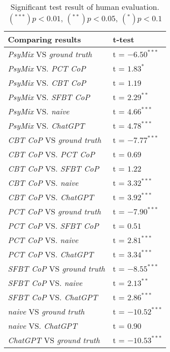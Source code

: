 \begin{table}[th]
    \centering
    \begin{tabular}{ll}
    \toprule
      Comparing results   & t-test \\   
    \midrule
    \textit{PsyMix} VS \textit{ground truth}    & t = $-6.50^{***}$     \\
    \textit{PsyMix} VS. \textit{PCT CoP}    & t = $1.83^{*}$  \\
    \textit{PsyMix} VS. \textit{CBT CoP}    & t = $1.19$  \\
    \textit{PsyMix} VS. \textit{SFBT CoP}    & t = $2.29^{**}$  \\
    \textit{PsyMix} VS. \textit{naive}    & t = $4.66^{***}$  \\
    \textit{PsyMix} VS. \textit{ChatGPT}    & t = $4.78^{***}$  \\
    \midrule
    \textit{CBT CoP} VS \textit{ground truth}    & t = $-7.77^{***}$     \\
    \textit{CBT CoP} VS. \textit{PCT CoP}    & t = $0.69$  \\
    \textit{CBT CoP} VS. \textit{SFBT CoP}    & t = $1.22$  \\
    \textit{CBT CoP} VS. \textit{naive}    & t = $3.32^{***}$  \\
    \textit{CBT CoP} VS. \textit{ChatGPT}    & t = $3.92^{***}$  \\
    \midrule
    \textit{PCT CoP} VS \textit{ground truth}    & t = $-7.90^{***}$     \\
    \textit{PCT CoP} VS. \textit{SFBT CoP}    & t = $0.51$  \\
    \textit{PCT CoP} VS. \textit{naive}    & t = $2.81^{***}$  \\
    \textit{PCT CoP} VS. \textit{ChatGPT}    & t = $3.34^{***}$  \\
    \midrule
    \textit{SFBT CoP} VS \textit{ground truth}    & t = $-8.55^{***}$     \\
    \textit{SFBT CoP} VS. \textit{naive}    & t = $2.13^{**}$  \\
    \textit{SFBT CoP} VS. \textit{ChatGPT}    & t = $2.86^{***}$  \\
    \midrule
    \textit{naive} VS \textit{ground truth}    & t = $-10.52^{***}$     \\
    \textit{naive} VS. \textit{ChatGPT}    & t = $0.90$  \\
    \midrule
    \textit{ChatGPT} VS \textit{ground truth}    & t = $-10.53^{***}$     \\
    \bottomrule
    \end{tabular}
    \caption{Significant test result of human evaluation. $(^{***})p<0.01$, $(^{**})p<0.05$, $(^*)p<0.1$}
    \label{tab:ttest}
\end{table}

